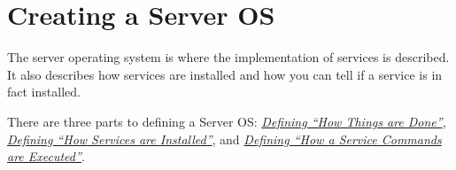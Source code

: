 \documentclass[letterpaper,10pt,english]{manual}
\begin{document}
\resetcurrentobjects
\hypertarget{--doc-gettingstarted/creating_serveros}{}

\hypertarget{gettingstarted-creating-serveros}{}\chapter{Creating a Server OS}

The server operating system is where the implementation of services is described. It also describes how services are installed and how you can tell if a service is in fact installed.

There are three parts to defining a Server OS: \hyperlink{howthingsaredone}{\emph{Defining ``How Things are Done''}}, \hyperlink{howservicesareinstalled}{\emph{Defining ``How Services are Installed''}}, and \hyperlink{howaservicecommandsareexecuted}{\emph{Defining ``How a Service Commands are Executed''}}.
\end{document}
